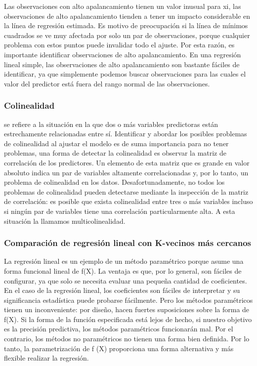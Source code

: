 \documentclass[
  letterpaper,
  DIV=11,
  numbers=noendperiod]{scrartcl}
\begin{document}
Las observaciones con alto apalancamiento tienen un valor inusual para
xi, las observaciones de alto apalancamiento tienden a tener un impacto
considerable en la línea de regresión estimada. Es motivo de
preocupación si la línea de mínimos cuadrados se ve muy afectada por
solo un par de observaciones, porque cualquier problema con estos puntos
puede invalidar todo el ajuste. Por esta razón, es importante
identificar observaciones de alto apalancamiento. En una regresión
lineal simple, las observaciones de alto apalancamiento son bastante
fáciles de identificar, ya que simplemente podemos buscar observaciones
para las cuales el valor del predictor está fuera del rango normal de
las observaciones.

\hypertarget{colinealidad}{%
\subsubsection{\texorpdfstring{\textbf{Colinealidad}}{Colinealidad}}\label{colinealidad}}

se refiere a la situación en la que dos o más variables predictoras
están estrechamente relacionadas entre sí. Identificar y abordar los
posibles problemas de colinealidad al ajustar el modelo es de suma
importancia para no tener problemas, una forma de detectar la
colinealidad es observar la matriz de correlación de los predictores. Un
elemento de esta matriz que es grande en valor absoluto indica un par de
variables altamente correlacionadas y, por lo tanto, un problema de
colinealidad en los datos. Desafortunadamente, no todos los problemas de
colinealidad pueden detectarse mediante la inspección de la matriz de
correlación: es posible que exista colinealidad entre tres o más
variables incluso si ningún par de variables tiene una correlación
particularmente alta. A esta situación la llamamos multicolinealidad.

\hypertarget{comparaciuxf3n-de-regresiuxf3n-lineal-con-k-vecinos-muxe1s-cercanos}{%
\subsubsection{\texorpdfstring{\textbf{Comparación de regresión lineal
con K-vecinos más
cercanos}}{Comparación de regresión lineal con K-vecinos más cercanos}}\label{comparaciuxf3n-de-regresiuxf3n-lineal-con-k-vecinos-muxe1s-cercanos}}

La regresión lineal es un ejemplo de un método paramétrico porque asume
una forma funcional lineal de f(X). La ventaja es que, por lo general,
son fáciles de configurar, ya que solo se necesita evaluar una pequeña
cantidad de coeficientes. En el caso de la regresión lineal, los
coeficientes son fáciles de interpretar y su significancia estadística
puede probarse fácilmente. Pero los métodos paramétricos tienen un
inconveniente: por diseño, hacen fuertes suposiciones sobre la forma de
f(X). Si la forma de la función especificada está lejos de hecho, si
nuestro objetivo es la precisión predictiva, los métodos paramétricos
funcionarán mal. Por el contrario, los métodos no paramétricos no tienen
una forma bien definida. Por lo tanto, la parametrización de f (X)
proporciona una forma alternativa y más flexible realizar la regresión.
\end{document}
